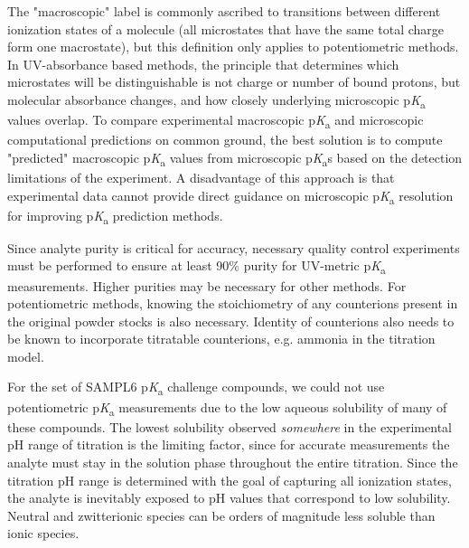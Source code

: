 \documentclass[9pt,lineno]{elife}
\newcommand{\pKa}{p\textit{K}\textsubscript{a}}
\begin{document}
The "macroscopic" label is commonly ascribed to transitions between different ionization states of a molecule (all microstates that have the same total charge form one macrostate), but this definition only applies to potentiometric methods. 
In UV-absorbance based methods, the principle that determines which microstates will be distinguishable is not charge or number of bound protons, but molecular absorbance changes, and how closely underlying microscopic \pKa{} values overlap. 
To compare experimental macroscopic \pKa{} and microscopic computational predictions on common ground, the best solution is to compute "predicted" macroscopic \pKa{} values from microscopic \pKa{}s based on the detection limitations of the experiment. 
A disadvantage of this approach is that experimental data cannot provide direct guidance on microscopic \pKa{} resolution for improving \pKa{} prediction methods.

Since analyte purity is critical for accuracy, necessary quality control experiments must be performed to ensure at least 90\% purity for UV-metric \pKa{} measurements. 
Higher purities may be necessary for other methods. 
For potentiometric methods, knowing the stoichiometry of any counterions present in the original powder stocks is also necessary. Identity of counterions also needs to be known to incorporate titratable counterions, e.g. ammonia in the titration model. 


For the set of SAMPL6 \pKa{} challenge compounds, we could not use potentiometric \pKa{} measurements due to the low aqueous solubility of many of these compounds. 
The lowest solubility observed \emph{somewhere} in the experimental pH range of titration is the limiting factor, since for accurate measurements the analyte must stay in the solution phase throughout the entire titration. 
Since the titration pH range is determined with the goal of capturing all ionization states, the analyte is inevitably exposed to pH values that correspond to low solubility. 
Neutral and zwitterionic species can be orders of magnitude less soluble than ionic species. 
\end{document}
